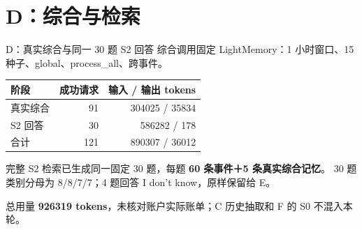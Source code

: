\section{D：综合与检索}
\begin{frame}{D：真实综合与同一 30 题 S2 回答}
\small
综合调用固定 LightMemory：1 小时窗口、15 种子、global、process\_all、跨事件。\par\vspace{2mm}
\begin{tabularx}{\linewidth}{@{}Yrr@{}}
\toprule
阶段 & 成功请求 & 输入 / 输出 tokens\\\midrule
真实综合 & 91 & 304025 / 35834\\
S2 回答 & 30 & 586282 / 178\\\midrule
合计 & 121 & 890307 / 36012\\\bottomrule
\end{tabularx}\par\vspace{2mm}
完整 S2 检索已生成同一固定 30 题，每题 \textbf{60 条事件＋5 条真实综合记忆}。
30 题类别分母为 8/8/7/7；4 题回答 I don't know，原样保留给 E。\par\vspace{2mm}
总用量 \textbf{926319 tokens}，未核对账户实际账单；C 历史抽取和 F 的 S0 不混入本轮。
\end{frame}
